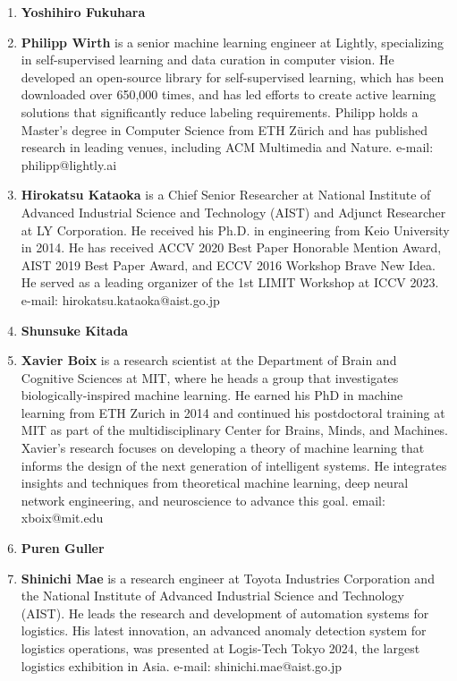 \documentclass{article}
\newcommand{\cYoshi}[1]{{\color{cyan}{#1}}} %
\begin{document}
\begin{enumerate}
    \item {\bf Yoshihiro Fukuhara} \cYoshi{Please write here by yourself.}

    \item {\bf Philipp Wirth} is a senior machine learning engineer at Lightly, specializing in self-supervised learning and data curation in computer vision. He developed an open-source library for self-supervised learning, which has been downloaded over 650,000 times, and has led efforts to create active learning solutions that significantly reduce labeling requirements. Philipp holds a Master’s degree in Computer Science from ETH Zürich and has published research in leading venues, including ACM Multimedia and Nature. e-mail: philipp@lightly.ai

    \item {\bf Hirokatsu Kataoka} is a Chief Senior Researcher at National Institute of Advanced Industrial Science and Technology (AIST) and Adjunct Researcher at LY Corporation. He received his Ph.D. in engineering from Keio University in 2014. He has received ACCV 2020 Best Paper Honorable Mention Award, AIST 2019 Best Paper Award, and ECCV 2016 Workshop Brave New Idea. He served as a leading organizer of the 1st LIMIT Workshop at ICCV 2023. e-mail: hirokatsu.kataoka@aist.go.jp

    \item {\bf Shunsuke Kitada} \cYoshi{Please write here by yourself.}

    \item {\bf Xavier Boix} is a research scientist at the Department of Brain and Cognitive Sciences at MIT, where he heads a group that investigates biologically-inspired machine learning. He earned his PhD in machine learning from ETH Zurich in 2014 and continued his postdoctoral training at MIT as part of the multidisciplinary Center for Brains, Minds, and Machines. Xavier's research focuses on developing a theory of machine learning that informs the design of the next generation of intelligent systems. He integrates insights and techniques from theoretical machine learning, deep neural network engineering, and neuroscience to advance this goal. email: xboix@mit.edu

    \item {\bf Puren Guller} \cYoshi{Please write here by yourself.}

    \item {\bf Shinichi Mae} is a research engineer at Toyota Industries Corporation and the National Institute of Advanced Industrial Science and Technology (AIST). He leads the research and development of automation systems for logistics. His latest innovation, an advanced anomaly detection system for logistics operations, was presented at Logis-Tech Tokyo 2024, the largest logistics exhibition in Asia. e-mail: shinichi.mae@aist.go.jp


\end{enumerate}
\end{document}
